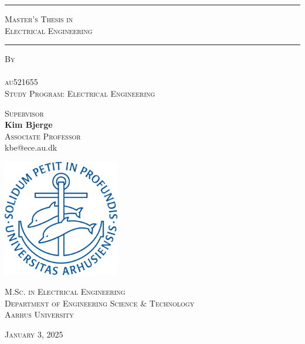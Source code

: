 \begin{titlepage}
    \centering
    \vspace*{-0.8cm}
    
    \rule{\linewidth}{0.3mm} %
    \vspace{1pt}
    {\LARGE\bfseries \ThesisTitle \par}
    \vspace{0.3cm}

    {\small\textsc{Master’s Thesis in\\
    Electrical Engineering}\par}

    \vspace{1pt}
    \rule{\linewidth}{0.3mm} %
    \vspace{0.2cm}
    
    {\small \textsc{By}\\[0.5cm]
    \normalsize \textbf{\AuthorName}\\
    \small \textsc{au521655\\
    Study Program: Electrical Engineering}\par} %
    \vspace{1cm}
    
    {\small \textsc{Supervisor}\\
    \normalsize \textbf{Kim Bjerge}\\
    \small \textsc{Associate Professor}\\
    kbe@ece.au.dk\par}
    \vspace{1.5cm}

    
    \includegraphics[width=0.38\textwidth]{Logo/aulogoblue.png}\par
    \vspace{1.5cm}

    
    {\textsc{M.Sc. in Electrical Engineering\\
    Department of Engineering
    Science \& Technology\\
    Aarhus University}}\par
    \vspace{1cm}
    
    {\normalsize \textsc{January 3, 2025}}
\end{titlepage}
